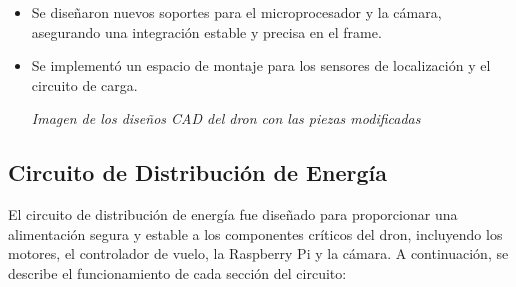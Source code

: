     \begin{itemize} 
        \item Se diseñaron nuevos soportes para el microprocesador y la cámara, asegurando una integración estable y precisa en el frame. 
        \item Se implementó un espacio de montaje para los sensores de localización y el circuito de carga. 
        \begin{center} 
            \textit{Imagen de los diseños CAD del dron con las piezas modificadas} 
        \end{center} 
    \end{itemize}

    \subsection{Circuito de Distribución de Energía} 
    El circuito de distribución de energía fue diseñado para proporcionar una alimentación segura y estable a los componentes críticos del dron, incluyendo los motores, el controlador de vuelo, la Raspberry Pi y la cámara. A continuación, se describe el funcionamiento de cada sección del circuito:
    
